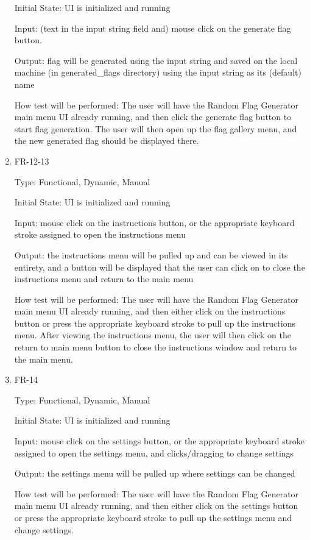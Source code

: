 \documentclass[12pt, titlepage]{article}
\begin{document}
\begin{enumerate}
Initial State: UI is initialized and running

Input: (text in the input string field and) mouse click on the generate flag button.

Output: flag will be generated using the input string and saved on the local
machine (in \/generated\_flags directory) using the input string as its
(default) name

How test will be performed: The user will have the Random Flag Generator main
menu UI already running, and then click the generate flag button to start flag
generation. The user will then open up the flag gallery menu, and the new
generated flag should be displayed there.

\item{FR-12-13\\}

Type: Functional, Dynamic, Manual

Initial State: UI is initialized and running

Input: mouse click on the instructions button, or the appropriate keyboard
stroke assigned to open the instructions menu

Output: the instructions menu will be pulled up and can be viewed in its
entirety, and a button will be displayed that the user can click on to close
the instructions menu and return to the main menu

How test will be performed: The user will have the Random Flag Generator main
menu UI already running, and then either click on the instructions button or
press the appropriate keyboard stroke to pull up the instructions menu. After
viewing the instructions menu, the user will then click on the return to main
menu button to close the instructions window and return to the main menu.

\item{FR-14\\}

Type: Functional, Dynamic, Manual

Initial State: UI is initialized and running

Input: mouse click on the settings button, or the appropriate keyboard stroke
assigned to open the settings menu, and clicks/dragging to change settings

Output: the settings menu will be pulled up where settings can be changed

How test will be performed: The user will have the Random Flag Generator main
menu UI already running, and then either click on the settings button or press
the appropriate keyboard stroke to pull up the settings menu and change
settings.


\end{enumerate}
\end{document}
